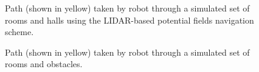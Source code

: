 				\begin{figure}[h!]
					\centering
					\caption{Path (shown in yellow) taken by robot through a simulated set of rooms and halls using the LIDAR-based potential fields navigation scheme.}
					\label{fig::potential_field_results}
				\end{figure}
				\begin{figure}[h!]
					\centering
					\caption{Path (shown in yellow) taken by robot through a simulated set of rooms and obstacles.}
					\label{fig::potential_field_results_obstacles}
				\end{figure}
		
